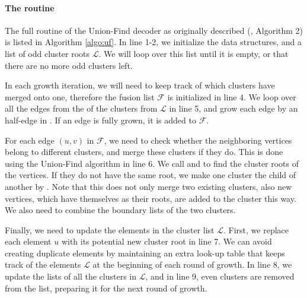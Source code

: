 \paragraph{The routine}
The full routine of the Union-Find decoder as originally described (\cite{nickerson2017}, Algorithm 2) is listed in Algorithm \ref{algo:uf}. In line 1-2, we initialize the data structures, and a list of odd cluster roots $\mathcal{L}$. We will loop over this list until it is empty, or that there are no more odd clusters left.

In each growth iteration, we will need to keep track of which clusters have merged onto one, therefore the fusion list $\mathcal{F}$ is initialized in line 4. We loop over all the edges from the  of the clusters from $\mathcal{L}$ in line 5, and grow each edge by an half-edge in . If an edge is fully grown, it is added to $\mathcal{F}$.

For each edge $(u,v)$ in $\mathcal{F}$, we need to check whether the neighboring vertices belong to different clusters, and merge these clusters if they do. This is done using the Union-Find algorithm in line 6. We call  and  to find the cluster roots of the vertices. If they do not have the same root, we make one cluster the child of another by . Note that this does not only merge two existing clusters, also new vertices, which have themselves as their roots, are added to the cluster this way. We also need to combine the boundary lists of the two clusters.

Finally, we need to update the elements in the cluster list $\mathcal{L}$. First, we replace each element $u$ with its potential new cluster root  in line 7. We can avoid creating duplicate elements by maintaining an extra look-up table that keeps track of the elements $\mathcal{L}$ at the beginning of each round of growth. In line 8, we update the  lists of all the clusters in $\mathcal{L}$, and in line 9, even clusters are removed from the list, preparing it for the next round of growth.

